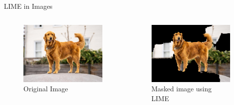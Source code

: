 \documentclass[final]{beamer}
\newlength{\colwidth}
\begin{document}
\begin{frame}[t]
\begin{columns}[t]
\begin{column}{\colwidth}
\begin{block}{LIME in Images}
    \begin{columns}
      \begin{column}{0.5\textwidth}
        \begin{figure}
          \centering
          \includegraphics[width=0.9\linewidth]{images/dog.jpeg}
          \caption{Original Image}
        \end{figure} 
      \end{column}

      \begin{column}{0.5\textwidth}
        \begin{figure}
          \centering
          \includegraphics[width=0.9\linewidth]{images/lime.png}
          \caption{Masked image using LIME}
        \end{figure}
      \end{column}

    \end{columns}



\end{block}
\end{column}
\end{columns}
\end{frame}
\end{document}
